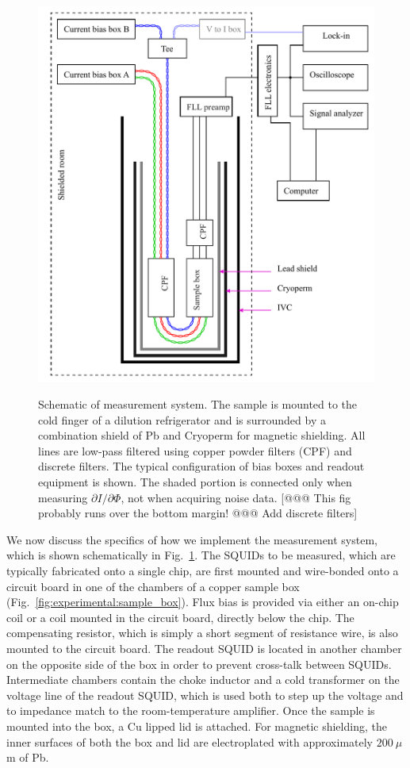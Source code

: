\begin{figure}
\centering\includegraphics{experimental/Fig_meas_schematic}\\
\caption[Schematic of measurement system]{Schematic of measurement system. The sample is mounted to the cold finger of a dilution refrigerator and is surrounded by a combination shield of Pb and Cryoperm for magnetic shielding. All lines are low-pass filtered using copper powder filters (CPF) and discrete filters. The typical configuration of bias boxes and readout equipment is shown. The shaded portion is connected only when measuring $\partial I/\partial \Phi$, not when acquiring noise data. [@@@ This fig probably runs over the bottom margin! @@@ Add discrete filters]}\label{Fig:meas_schem}
\end{figure}

We now discuss the specifics of how we implement the measurement system, which is shown schematically in Fig.~\ref{Fig:meas_schem}. The SQUIDs to be measured, which are typically fabricated onto a single chip, are first mounted and wire-bonded onto a circuit board in one of the chambers of a copper sample box (Fig.~\ref{fig:experimental:sample_box}). Flux bias is provided via either an on-chip coil or a coil mounted in the circuit board, directly below the chip. The compensating resistor, which is simply a short segment of resistance wire, is also mounted to the circuit board. The readout SQUID is located in another chamber on the opposite side of the box in order to prevent cross-talk between SQUIDs. Intermediate chambers contain the choke inductor and a cold transformer on the voltage line of the readout SQUID, which is used both to step up the voltage and to impedance match to the room-temperature amplifier. Once the sample is mounted into the box, a Cu lipped lid is attached. For magnetic shielding, the inner surfaces of both the box and lid are electroplated with approximately $200~\mu$m of Pb.

